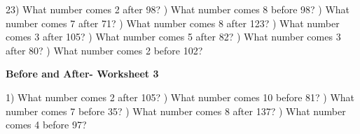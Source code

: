 \documentclass{article}%
\begin{document}
23) What number comes 2 after 98?%
\newline%
\newline%
) What number comes 8 before 98?%
\newline%
\newline%
) What number comes 7 after 71?%
\newline%
\newline%
) What number comes 8 after 123?%
\newline%
\newline%
) What number comes 3 after 105?%
\newline%
\newline%
) What number comes 5 after 82?%
\newline%
\newline%
) What number comes 3 after 80?%
\newline%
\newline%
) What number comes 2 before 102?%
\newline%
\newline%
\newline%
\pagebreak%
\large%
\begin{center}%
\textbf{Before and After- Worksheet 3}%
\newline%
\newline%
\newline%
\end{center} \normalsize%
1) What number comes 2 after 105?%
\newline%
\newline%
) What number comes 10 before 81?%
\newline%
\newline%
) What number comes 7 before 35?%
\newline%
\newline%
) What number comes 8 after 137?%
\newline%
\newline%
) What number comes 4 before 97?%
\newline%
\end{document}
